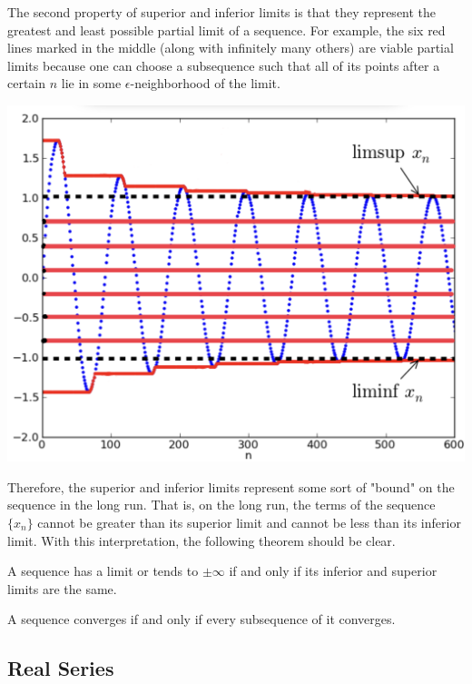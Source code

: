 \documentclass{article}
\begin{document}
\begin{definition}
        The second property of superior and inferior limits is that they represent the greatest and least possible partial limit of a sequence. For example, the six red lines marked in the middle (along with infinitely many others) are viable partial limits because one can choose a subsequence such that all of its points after a certain $n$ lie in some $\epsilon$-neighborhood of the limit. 
        \begin{center}
            \includegraphics[scale=0.12]{img/Sup_Inf_Limits_as_Limit_Bounds.jpeg}
        \end{center}
        Therefore, the superior and inferior limits represent some sort of "bound" on the sequence in the long run. That is, on the long run, the terms of the sequence $\{x_n\}$ cannot be greater than its superior limit and cannot be less than its inferior limit. With this interpretation, the following theorem should be clear. 
      \end{definition}

      \begin{theorem}
      A sequence has a limit or tends to $\pm \infty$ if and only if its inferior and superior limits are the same. 
      \end{theorem}

      \begin{corollary}
      A sequence converges if and only if every subsequence of it converges. 
      \end{corollary}

  \subsection{Real Series}
\end{document}
